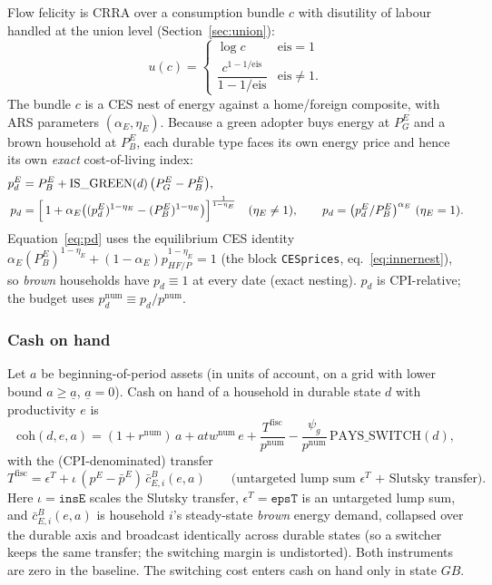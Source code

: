 \documentclass[11pt,a4paper]{article}
\newcommand{\num}{\mathrm{num}}
\newcommand{\PEB}{P^{E}_{B}}
\newcommand{\PEG}{P^{E}_{G}}
\newcommand{\pE}{p^{E}}
\newcommand{\coh}{\mathrm{coh}}
\begin{document}
Flow felicity is CRRA over a consumption bundle $c$ with disutility of labour
handled at the union level (Section~\ref{sec:union}):
\begin{equation}
u(c)=\begin{cases}\log c & \text{eis}=1\\[2pt]
\dfrac{c^{1-1/\text{eis}}}{1-1/\text{eis}} & \text{eis}\neq 1.\end{cases}
\end{equation}
The bundle $c$ is a CES nest of energy against a home/foreign composite, with
ARS parameters $(\alpha_E,\eta_E)$. Because a green adopter buys energy at $\PEG$
and a brown household at $\PEB$, each durable type faces its own energy price and
hence its own \emph{exact} cost-of-living index:
\begin{align}
\pE_d &= \PEB + \mathrm{IS\_GREEN}(d)\,\bigl(\PEG-\PEB\bigr),\\
p_d &= \Bigl[\,1+\alpha_E\bigl((\pE_d)^{1-\eta_E}-(\PEB)^{1-\eta_E}\bigr)\Bigr]^{\frac{1}{1-\eta_E}}
\quad(\eta_E\neq 1),\qquad
p_d=\bigl(\pE_d/\PEB\bigr)^{\alpha_E}\ (\eta_E=1).
\label{eq:pd}
\end{align}
Equation~\eqref{eq:pd} uses the equilibrium CES identity
$\alpha_E(\PEB)^{1-\eta_E}+(1-\alpha_E)p_{HF/P}^{1-\eta_E}=1$
(the block \texttt{CESprices}, eq.~\eqref{eq:innernest}), so \emph{brown}
households have $p_d\equiv 1$ at every date (exact nesting). $p_d$ is
CPI-relative; the budget uses $p_d^{\num}\equiv p_d/p^{\num}$.

\subsubsection{Cash on hand}\label{sec:coh}

Let $a$ be beginning-of-period assets (in units of account, on a grid with lower
bound $a\ge \underline a$, $\underline a=0$). Cash on hand of a household in
durable state $d$ with productivity $e$ is
\begin{equation}
\coh(d,e,a)=(1+r^{\num})\,a+atw^{\num}\,e
+\frac{T^{\text{fisc}}}{p^{\num}}
-\frac{\psi_g}{p^{\num}}\,\mathrm{PAYS\_SWITCH}(d),
\label{eq:coh}
\end{equation}
with the (CPI-denominated) transfer
\begin{equation}
T^{\text{fisc}} = \epsilon^{T}+\iota\,(\pE-\bar\pE)\,\bar c^{B}_{E,i}(e,a)
\qquad\text{(untargeted lump sum $\epsilon^{T}$ + Slutsky transfer).}
\end{equation}
Here $\iota=\texttt{insE}$ scales the Slutsky transfer, $\epsilon^{T}=\texttt{epsT}$
is an untargeted lump sum, and $\bar c^{B}_{E,i}(e,a)$ is household $i$'s
steady-state \emph{brown} energy demand, collapsed over the durable axis and
broadcast identically across durable states (so a switcher keeps the same
transfer; the switching margin is undistorted). Both instruments are zero in the
baseline. The switching cost enters cash on hand only in state $GB$.
\end{document}
